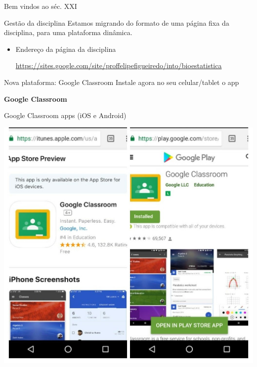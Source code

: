 \documentclass{beamer}
\begin{document}
\begin{frame}{\scriptsize Bem vindos ao séc. XXI}
  \begin{block}{Gestão da disciplina}
    \footnotesize
    Estamos migrando do formato de uma página fixa da disciplina, para uma plataforma dinâmica.
  \end{block}
  \begin{itemize}
    \footnotesize
  \item Endereço da página da disciplina

    \url{https://sites.google.com/site/proffelipefigueiredo/into/bioestatistica}
  \end{itemize}
  \begin{block}{Nova plataforma: Google Classroom}
    \footnotesize
    Instale agora no seu celular/tablet o app

    \bigskip
    {\bf Google Classroom}
  \end{block}
\end{frame}

\begin{frame}{\scriptsize Google Classroom apps (iOS e Android)}
  \begin{center}
    \includegraphics[height=\textheight]{Cap1/gclassroom-apps}
  \end{center}
\end{frame}
\end{document}
